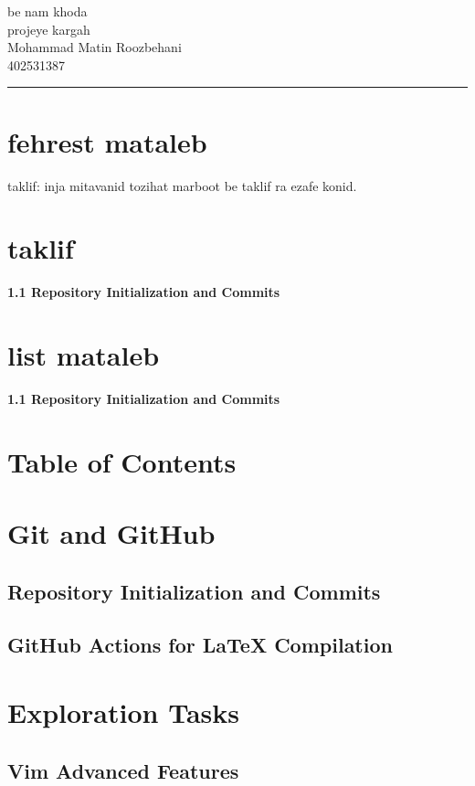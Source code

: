 \documentclass{article}
\begin{document}
\begin{center}
    {\Huge be nam khoda} \\[1cm]
    {\LARGE projeye kargah} \\[0.5cm]
    {\large Mohammad Matin Roozbehani} \\[0.5cm]
    {\large 402531387} \\[1cm]
    \hrule
\end{center}

\vspace{1cm}

\section*{fehrest mataleb}
taklif: inja mitavanid tozihat marboot be taklif ra ezafe konid.

\newpage

\section*{taklif}

\textbf{1.1 Repository Initialization and Commits}


\section*{list mataleb}

\textbf{1.1 Repository Initialization and Commits}
\section*{Table of Contents}

\section{Git and GitHub}
\subsection{Repository Initialization and Commits}
\subsection{GitHub Actions for LaTeX Compilation}

\section{Exploration Tasks}
\subsection{Vim Advanced Features}
\end{document}

